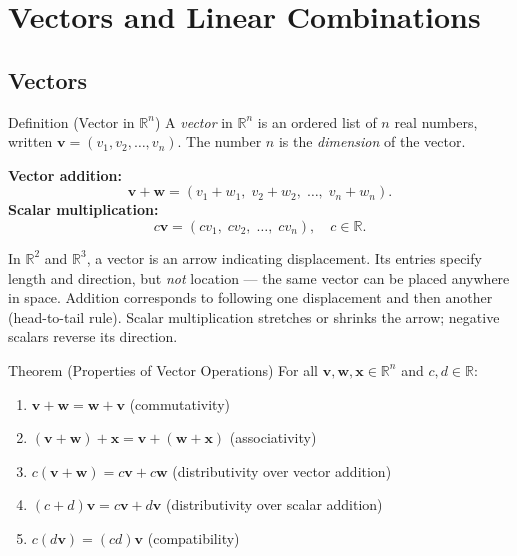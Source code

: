 
\section{Vectors and Linear Combinations}

\subsection*{Vectors}

\begin{propositionbox}{Definition (Vector in $\mathbb{R}^n$)}
A \emph{vector} in $\mathbb{R}^n$ is an ordered list of $n$ real numbers,
written $\mathbf{v} = (v_1, v_2, \ldots, v_n)$.
The number $n$ is the \emph{dimension} of the vector.

\medskip
\textbf{Vector addition:}
\[
  \mathbf{v} + \mathbf{w} = (v_1 + w_1,\; v_2 + w_2,\; \ldots,\; v_n + w_n).
\]
\textbf{Scalar multiplication:}
\[
  c\mathbf{v} = (cv_1,\; cv_2,\; \ldots,\; cv_n), \quad c \in \mathbb{R}.
\]
\end{propositionbox}

\begin{remark*}
In $\mathbb{R}^2$ and $\mathbb{R}^3$, a vector is an arrow indicating displacement.
Its entries specify length and direction, but \emph{not} location ---
the same vector can be placed anywhere in space.
Addition corresponds to following one displacement and then another (head-to-tail rule).
Scalar multiplication stretches or shrinks the arrow; negative scalars reverse its direction.
\end{remark*}

\begin{theorembox}{Theorem (Properties of Vector Operations)}
For all $\mathbf{v}, \mathbf{w}, \mathbf{x} \in \mathbb{R}^n$ and $c, d \in \mathbb{R}$:
\begin{enumerate}
  \item $\mathbf{v} + \mathbf{w} = \mathbf{w} + \mathbf{v}$ \hfill (commutativity)
  \item $(\mathbf{v} + \mathbf{w}) + \mathbf{x} = \mathbf{v} + (\mathbf{w} + \mathbf{x})$ \hfill (associativity)
  \item $c(\mathbf{v} + \mathbf{w}) = c\mathbf{v} + c\mathbf{w}$ \hfill (distributivity over vector addition)
  \item $(c + d)\mathbf{v} = c\mathbf{v} + d\mathbf{v}$ \hfill (distributivity over scalar addition)
  \item $c(d\mathbf{v}) = (cd)\mathbf{v}$ \hfill (compatibility)
\end{enumerate}
\end{theorembox}

